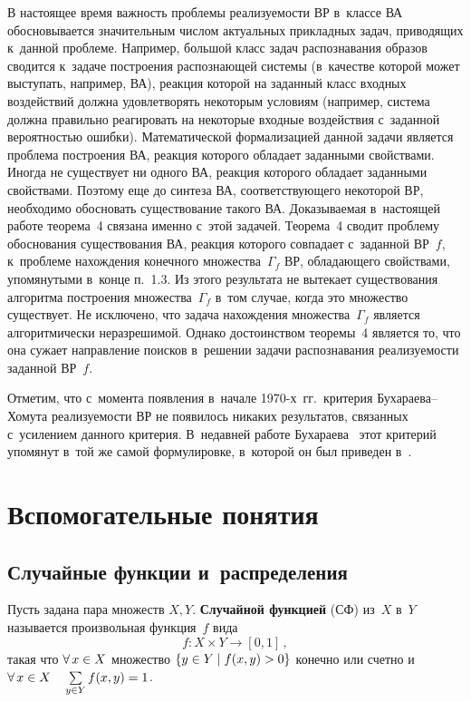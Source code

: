 \begin{multicols}{2}
В настоящее время важность проблемы реализуемости ВР
в~классе ВА обосновывается значительным чис\-лом
актуальных прикладных задач, приводящих к~данной проблеме.
Например, большой класс задач распознавания образов
сводится к~задаче построения распознающей сис\-те\-мы
(в~качестве которой может выступать, например, ВА),
реакция которой на заданный класс входных воздействий
должна удовлетворять некоторым условиям (например, сис\-те\-ма
должна правильно реагировать на некоторые
входные воздействия с~заданной вероятностью ошибки).
Математической формализацией данной задачи
является проблема построения ВА, реакция которого обладает
заданными свойствами. Иногда не существует ни одного ВА, реакция которого обладает
заданными свойствами. Поэтому еще до синтеза ВА, соответствующего некоторой ВР,
необходимо обосновать существование такого ВА.
Доказываемая в~настоящей работе теорема~4
связана именно с~этой задачей.  Теорема~4 сводит проблему  обоснования
существования ВА, реакция которого совпадает с~заданной ВР~$f$,
к~проблеме нахождения конечного множества~$\Gamma_f$ ВР, обла\-да\-юще\-го
 свойствами, упомянутыми в~конце п.~1.3.
Из этого результата не вытекает существования
алгоритма построения множества~$\Gamma_f$
в~том случае, когда это множество существует.
Не исключено, что задача нахождения множества~$\Gamma_f$
является алгоритмически неразрешимой.
Однако достоинством теоремы~4 является то, что она сужает направление
поисков в~решении задачи распознавания реализуемости заданной ВР~$f$.

Отметим, что с~момента появления в~начале 1970-х~гг.\
критерия Бу\-ха\-ра\-ева--Хо\-му\-та реали\-зу\-емости ВР
не появилось никаких  результатов,
связанных с~усилением данного критерия.
В~недавней работе Бухараева~\cite{24-mir} этот критерий
упомянут  в~той же самой формулировке, в~которой
он был приведен в~\cite{22-mir, 23-mir}.


\section{Вспомогательные понятия}

\subsection{Случайные функции и~распределения} %

Пусть задана пара множеств $X,Y$. \textbf{Случайной функцией} (СФ)
из~$X$ в~$Y$ называется произвольная функция~$f$ вида
\begin{equation*}
f: X\times Y \to [0,1]\,,
\end{equation*} 
такая что $\forall\,x\hm\in X$ множество
$\{y\hm\in Y\mid f(x,y)\hm>0\}$  конечно или счетно и~$\forall\,x\hm\in
X\quad \sum\limits_{y\in Y}f(x,y)\hm=1$.


\end{multicols}
